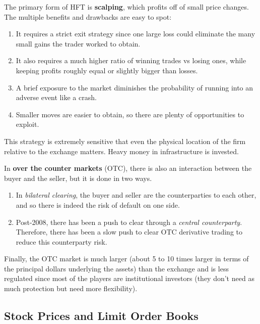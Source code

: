 \documentclass{article}
\begin{document}
      The primary form of HFT is \textbf{scalping}, which profits off of small price changes. The multiple benefits and drawbacks are easy to spot: 
      \begin{enumerate}
          \item It requires a strict exit strategy since one large loss could eliminate the many small gains the trader worked to obtain. 
          \item It also requires a much higher ratio of winning trades vs losing ones, while keeping profits roughly equal or slightly bigger than losses. 
          \item A brief exposure to the market diminishes the probability of running into an adverse event like a crash. 
          \item Smaller moves are easier to obtain, so there are plenty of opportunities to exploit. 
      \end{enumerate}
      This strategy is extremely sensitive that even the physical location of the firm relative to the exchange matters. Heavy money in infrastructure is invested. 


    \begin{definition}
      In \textbf{over the counter markets} (OTC), there is also an interaction between the buyer and the seller, but it is done in two ways. 
      \begin{enumerate}
        \item In \textit{bilateral clearing}, the buyer and seller are the counterparties to each other, and so there is indeed the risk of default on one side. 
        \item Post-2008, there has been a push to clear through a \textit{central counterparty}. Therefore, there has been a slow push to clear OTC derivative trading to reduce this counterparty risk. 
      \end{enumerate}
      Finally, the OTC market is much larger (about 5 to 10 times larger in terms of the principal dollars underlying the assets) than the exchange and is less regulated since most of the players are institutional investors (they don't need as much protection but need more flexibility).  
    \end{definition}

  \subsection{Stock Prices and Limit Order Books}
\end{document}
